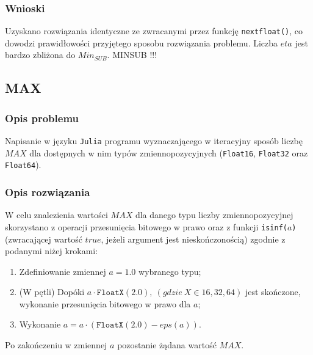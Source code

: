 \documentclass{classrep}
\begin{document}
		\subsubsection{Wnioski}
			Uzyskano rozwiązania identyczne ze zwracanymi przez funkcję \texttt{nextfloat()}, co dowodzi 
			prawidłowości przyjętego sposobu rozwiązania problemu.
			\newline
			Liczba $eta$ jest bardzo zbliżona do $Min_{SUB}$.
			MINSUB !!!
	\subsection{MAX}
		\subsubsection{Opis problemu}
			Napisanie w języku \texttt{Julia} programu wyznaczającego w iteracyjny sposób liczbę 
			$MAX$ dla dostępnych w nim typów zmiennopozycyjnych (\texttt{Float16}, 
			\texttt{Float32} oraz \texttt{Float64}).
		\subsubsection{Opis rozwiązania}
			W celu znalezienia wartości $MAX$ dla danego typu liczby zmiennopozycyjnej skorzystano
			z operacji przesunięcia bitowego w prawo oraz z funkcji \texttt{isinf($a$)} (zwracającej wartość 
			$true$, jeżeli argument jest nieskończonością) zgodnie z podanymi niżej 
			krokami:
			\begin{enumerate}
				\item Zdefiniowanie zmiennej $a = 1.0$ wybranego typu;
				\item (W pętli) Dopóki $a \cdot \texttt{FloatX}(2.0), ~(gdzie ~X \in {16,32,64})$ jest skończone, wykonanie przesunięcia bitowego w prawo dla $a$;
				\item Wykonanie $a = a \cdot (\texttt{FloatX}(2.0) - eps(a))$.
			\end{enumerate}
			Po zakończeniu w zmiennej $a$ pozostanie żądana wartość $MAX$.	
\end{document}
